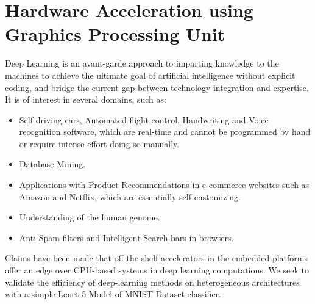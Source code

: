 \chapter{Hardware Acceleration using Graphics Processing Unit}
\label{ch3_cnn}
Deep Learning is an avant-garde approach to imparting knowledge to the machines to achieve the ultimate goal of artificial intelligence without explicit coding, and bridge the current gap between technology integration and expertise. It is of interest in several domains\cite{wiki_ml}, such as:
\begin{itemize}
\item Self-driving cars, Automated flight control, Handwriting and Voice recognition software, which are real-time and cannot be programmed by hand or require intense effort doing so manually.
\item Database Mining.
\item Applications with Product Recommendations in e-commerce websites such as Amazon and Netflix, which are essentially self-customizing.
\item Understanding of the human genome.
\item Anti-Spam filters and Intelligent Search bars in browsers.
\end{itemize} 
Claims have been made that off-the-shelf accelerators in the embedded platforms offer an edge over CPU-based systems in deep learning computations\cite{hegde2016caffepresso}. We seek to validate the efficiency of deep-learning methods on heterogeneous architectures with a simple Lenet-5 Model of MNIST Dataset classifier. 
